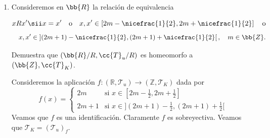 \documentclass[12pt]{article}
\begin{document}
\begin{ejercicio}
\begin{enumerate}[label=\alph*)]
                 Recordemos que $f$ es continua en $x$ si y solo si para toda $B' \in \mathcal{B}_{f(x)}$ existe $B \in \mathcal{B}_x$ tal que $f(B) \subset B'$.
            
                Supongamos que $f$ es continua y sea $x$ un número par. Supongamos en primer lugar que $f(x)$ es impar. Entonces tenemos que $B' = \{f(x)\}$ y $B = \{x-1, x, x+1\}$ y $f$ es continua en $x$ si y solo si $f(\{x-1, x, x+1\}) \subset \{f(x)\}$, es decir si y solo si $f(x\pm 1) = f(x)$.
                
                Supongamos ahora que $f(x)$ es par. Entonces $B' = \{f(x)-1, f(x), f(x)+1\}$ y $B = \{x-1, x, x+1\}$ y $f$ es continua en $x$ si y solo si $\{f(x\pm 1), f(x)\} \subset \{f(x)\pm 1, f(x)\}$.
                
                Observemos que esto y lo anterior implican e2) en el caso $x$ par. Si $x$ es impar para obtener e2) basta aplicar e2) a $x+1$ y $x-1$ que son pares.
                
                Recíprocamente, supongamos que se verifica e1) y e2). Por lo visto en la implicación anterior se tendría que $f$ es continua en los números pares. Notemos que cualquier $f$ es continua en $x$ si $x$ es un número impar ya que en este caso $B = \{x\}$ siempre verifica $f(B) \subset B'$ para cualquier $B'$.
            
            \item Consideremos en $\bb{R}$ la relación de equivalencia
            
            $$x R x' \sii x = x' \quad \text{o} \quad x, x' \in \left[2m - \nicefrac{1}{2}, 2m + \nicefrac{1}{2}\right] \quad \text{o} $$ $$ \quad x, x' \in \left](2m+1) - \nicefrac{1}{2}, (2m+1) + \nicefrac{1}{2}\right[, \quad m \in \bb{Z}.$$
            
            Demuestra que $(\bb{R}/R, \cc{T}_u/R)$ es homeomorfo a $(\bb{Z}, \cc{T}_K)$.

                Consideremos la aplicación $f: (\mathbb{R}, \mathcal{T}_u) \rightarrow (\mathbb{Z}, \mathcal{T}_K)$ dada por
                \[
                f(x) = \begin{cases}
                2m & \text{si } x \in [2m - \frac{1}{2}, 2m + \frac{1}{2}] \\
                2m+1 & \text{si } x \in ](2m+1) - \frac{1}{2}, (2m+1) + \frac{1}{2}[
                \end{cases}
                \]
                Veamos que $f$ es una identificación. Claramente $f$ es sobreyectiva. Veamos que $\mathcal{T}_K = (\mathcal{T}_u)_f$.
                

\end{enumerate}
\end{ejercicio}
\end{document}
